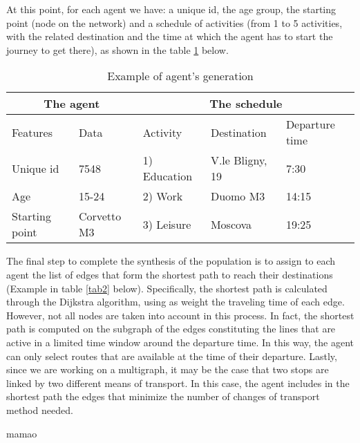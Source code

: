 At this point, for each agent we have: a unique id, the age group, the starting point (node on the network) and a schedule of activities (from 1 to 5 activities, with the related destination and the time at which the agent has to start the journey to get there), as shown in the table \ref{tab1} below. 

\begin{table}[h]
\centering
\caption{Example of agent's generation}\label{tab1}%
\begin{tabular}{ll|lll}
\multicolumn{2}{c|}{The agent} & \multicolumn{3}{c}{The schedule} \\ 
\toprule
Features      & Data      & Activity & Destination & Departure time \\ 
\midrule
Unique id & 7548 & 1) Education & V.le Bligny, 19 & 7:30\\
Age & 15-24  &  2) Work	& Duomo M3 & 14:15\\
Starting point & Corvetto M3 & 3) Leisure & Moscova & 19:25\\
\bottomrule
\end{tabular}
\end{table}

The final step to complete the synthesis of the population is to assign to each agent the list of edges that form the shortest path to reach their destinations (Example in table \ref{tab2} below). Specifically, the shortest path is calculated through the Dijkstra algorithm, using as weight the traveling time of each edge. However, not all nodes are taken into account in this process. In fact, the shortest path is computed on the subgraph of the edges constituting the lines that are active in a limited time window around the departure time. In this way, the agent can only select routes that are available at the time of their departure. Lastly, since we are working on a multigraph, it may be the case that two stops are linked by two different means of transport. In this case, the agent includes in the shortest path the edges that minimize the number of changes of transport method needed.

mamao